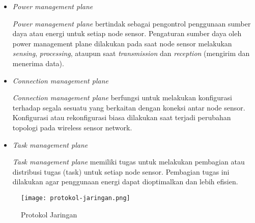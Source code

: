 \begin{itemize}
    \item \textit{Power management plane}
    
    \textit{Power management plane} bertindak sebagai pengontrol penggunaan sumber daya atau energi untuk setiap node sensor. Pengaturan sumber daya oleh power management plane dilakukan pada saat node sensor melakukan \textit{sensing}, \textit{processing}, ataupun saat \textit{transmission} dan \textit{reception} (mengirim dan menerima data). 
    
    \item \textit{Connection management plane}
    
    \textit{Connection management plane} berfungsi untuk melakukan konfigurasi terhadap segala sesuatu yang berkaitan dengan koneksi antar node sensor. Konfigurasi atau rekonfigurasi biasa dilakukan saat terjadi perubahan topologi pada wireless sensor network. 
    
    \item \textit{Task management plane}
    
   \textit{Task management plane} memiliki tugas untuk melakukan pembagian atau distribusi tugas (task) untuk setiap node sensor. Pembagian tugas ini dilakukan agar penggunaan energi dapat dioptimalkan dan lebih efisien.
    
\end{itemize}

    \begin{figure}[H]
    	\centering  
    	\texttt{[image: protokol-jaringan.png]}  
    	\caption[Protokol Jaringan]{Protokol Jaringan}
    	\label{fig:Protokol Jaringan} 
    \end{figure}




